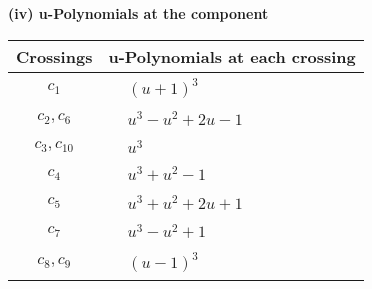 \documentclass[1p]{elsarticle_modified}
\theoremstyle{definition}
\begin{document}
\newpage\renewcommand{\arraystretch}{1}
\flushleft \textbf{(iv) u-Polynomials at the component}\newline \\
\begin{tabular}{m{50pt}|m{274pt}}
Crossings & \hspace{64pt}u-Polynomials at each crossing \\
\hline $$\begin{aligned}c_{1}\end{aligned}$$&$\begin{aligned}
&(u+1)^3
\end{aligned}$\\
\hline $$\begin{aligned}c_{2},c_{6}\end{aligned}$$&$\begin{aligned}
&u^3- u^2+2 u-1
\end{aligned}$\\
\hline $$\begin{aligned}c_{3},c_{10}\end{aligned}$$&$\begin{aligned}
&u^3
\end{aligned}$\\
\hline $$\begin{aligned}c_{4}\end{aligned}$$&$\begin{aligned}
&u^3+u^2-1
\end{aligned}$\\
\hline $$\begin{aligned}c_{5}\end{aligned}$$&$\begin{aligned}
&u^3+u^2+2 u+1
\end{aligned}$\\
\hline $$\begin{aligned}c_{7}\end{aligned}$$&$\begin{aligned}
&u^3- u^2+1
\end{aligned}$\\
\hline $$\begin{aligned}c_{8},c_{9}\end{aligned}$$&$\begin{aligned}
&(u-1)^3
\end{aligned}$\\
\hline
\end{tabular}\\~\\
\newpage\renewcommand{\arraystretch}{1}
\end{document}
